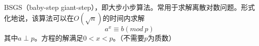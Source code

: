 BSGS（baby-step giant-step），即大步小步算法。常用于求解离散对数问题。形式化地说，该算法可以在$O(\sqrt n)$的时间内求解
$$
a^x \equiv b(mod\ p)
$$
其中$a \perp p$。方程的解满足$0 < x < p$。（不需要$p$为质数）
